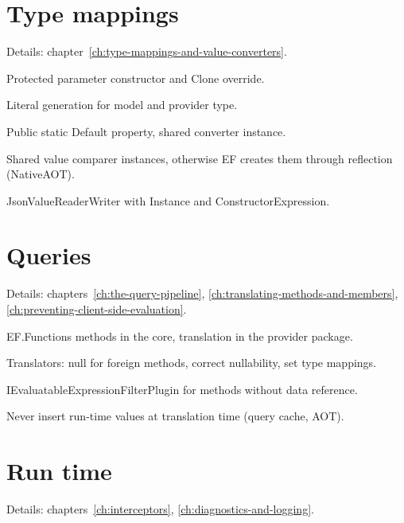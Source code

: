 \section{Type mappings}

\noindent Details: chapter~\ref{ch:type-mappings-and-value-converters}.

\begin{checklist}
  \item Protected parameter constructor and Clone override.
  \item Literal generation for model and provider type.
  \item Public static Default property, shared converter instance.
  \item Shared value comparer instances, otherwise EF creates them through reflection (NativeAOT).
  \item JsonValueReaderWriter with Instance and ConstructorExpression.
\end{checklist}

\section{Queries}

\noindent Details: chapters~\ref{ch:the-query-pipeline}, \ref{ch:translating-methods-and-members}, \ref{ch:preventing-client-side-evaluation}.

\begin{checklist}
  \item EF.Functions methods in the core, translation in the provider package.
  \item Translators: null for foreign methods, correct nullability, set type mappings.
  \item IEvaluatableExpressionFilterPlugin for methods without data reference.
  \item Never insert run-time values at translation time (query cache, AOT).
\end{checklist}

\section{Run time}

\noindent Details: chapters~\ref{ch:interceptors}, \ref{ch:diagnostics-and-logging}.

